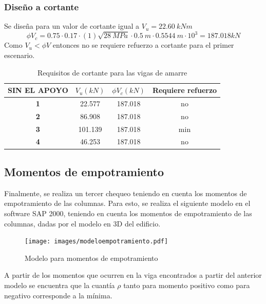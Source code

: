 \documentclass[12pt]{article}
\begin{document}
\subsubsection{Diseño a cortante}
Se diseña para un valor de cortante igual a $V_{u}=22.60~kNm$
\begin{equation*}
    \phi V_{c}=0.75\cdot 0.17\cdot(1)\sqrt{28~MPa}\cdot 0.5~m \cdot 0.5544~m\cdot 10^3=187.018 kN
\end{equation*}
Como $V_{u}<\phi V$ entonces no se requiere refuerzo a cortante para el primer escenario.
\begin{table}[H]
  \centering
  
    \begin{tabular}{|c|c|c|c|}
    \hline
    \rowcolor[rgb]{ 1,  .949,  .8} \textbf{SIN EL APOYO} & \textbf{$V_u (kN)$} & \cellcolor[rgb]{ 1,  1,  1}\textbf{$\phi V_c (kN)$} & \multicolumn{1}{p{5.355em}|}{\cellcolor[rgb]{ 1,  1,  1}\textbf{Requiere refuerzo}} \bigstrut\\
    \hline
    \textbf{1} & 22.577 & 187.018 & no \bigstrut\\
    \hline
    \textbf{2} & 86.908 & 187.018 & no \bigstrut\\
    \hline
    \textbf{3} & 101.139 & 187.018 & min \bigstrut\\
    \hline
    \textbf{4} & 46.253 & 187.018 & no \bigstrut\\
    \hline
    \end{tabular}%
    \caption{Requisitos de cortante para las vigas de amarre}
  \label{tab:requisitoscortante}%
\end{table}%

\subsection{Momentos de empotramiento}
Finalmente, se realiza un tercer chequeo teniendo en cuenta los momentos de empotramiento de las columnas. Para esto, se realiza el siguiente modelo en el software SAP 2000, teniendo en cuenta los momentos de empotramiento de las columnas, dadas por el modelo en 3D del edificio.
\begin{figure}[H]
    \centering
    \texttt{[image: images/modeloempotramiento.pdf]}
    \caption{Modelo para momentos de empotramiento}
    \label{fig:empotramiento}
\end{figure}

A partir de los momentos que ocurren en la viga encontrados a partir del anterior modelo se encuentra que la cuantía $\rho$ tanto para momento positivo como para negativo corresponde a la mínima.




% 
% 
% 
% 
\end{document}
